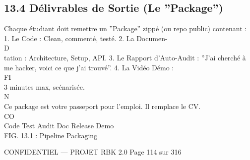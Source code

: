 \subsection{13.4 Délivrables de Sortie (Le ”Package”)}
Chaque étudiant doit remettre un ”Package” zippé (ou repo public) contenant : 1. Le Code : Clean, commenté, testé. 2. La Documen-\\
\vspace{0.5em}
\vspace{0.5em}
\vspace{0.5em}
\vspace{0.5em}
D\\
tation : Architecture, Setup, API. 3. Le Rapport d’Auto-Audit : ”J’ai cherché à me hacker, voici ce que j’ai trouvé”. 4. La Vidéo Démo :\\
\vspace{0.5em}
\vspace{0.5em}
\vspace{0.5em}
\vspace{0.5em}
FI\\
3 minutes max, scénarisée.\\
\vspace{0.5em}
N\\
Ce package est votre passeport pour l’emploi. Il remplace le CV.\\
CO\\
Code         Test       Audit Doc          Release        Demo\\
\vspace{0.5em}
FIG. 13.1 : Pipeline Packaging\\
\vspace{0.5em}
\vspace{0.5em}
\vspace{0.5em}
\vspace{0.5em}
\begin{confidential}CONFIDENTIEL — PROJET RBK 2.0                                   Page 114 sur 316\end{confidential}
